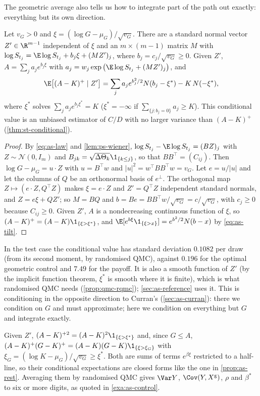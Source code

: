 The geometric average also tells us how to integrate part of the path out exactly: everything
but its own direction.

\begin{proposition}\label{prop:as-rest}
Let $v_G>0$ and $\xi=(\log G-\mu_G)/\sqrt{v_G}$. There are a standard normal vector
$Z'\in\R^{m-1}$ independent of $\xi$ and an $m\times(m-1)$ matrix $M$ with
$\log S_{t_j}=\E\log S_{t_j}+b_j\xi+(MZ')_j$, where $b_j=c_j/\sqrt{v_G}\ge0$. Given $Z'$,
$A=\sum_ja_je^{b_j\xi}$ with $a_j=w_j\exp\big(\E\log S_{t_j}+(MZ')_j\big)$, and
\[
  \E\big[(A-K)^+\mid Z'\big]=\sum_ja_je^{b_j^2/2}N(b_j-\xi^*)-K\,N(-\xi^*),
\]
where $\xi^*$ solves $\sum_ja_je^{b_j\xi^*}=K$ ($\xi^*=-\infty$ if
$\sum_{\{j:b_j=0\}}a_j\ge K$). This conditional value is an unbiased estimator of $C/D$ with
no larger variance than $(A-K)^+$ (\cref{thm:st-conditional}).
\end{proposition}

\begin{proof}
By \eqref{eq:as-law} and \cref{lem:ps-wiener}, $\log S_{t_j}-\E\log S_{t_j}=(BZ)_j$ with
$Z\sim\mathcal N(0,I_m)$ and $B_{jk}=\sqrt{\Delta\Theta_k}\1_{\{k\le j\}}$, so that $BB^\top=(C_{ij})$.
Then $\log G-\mu_G=u\cdot Z$ with $u=B^\top w$ and $|u|^2=w^\top BB^\top w=v_G$. Let $e=u/|u|$
and let the columns of $Q$ be an orthonormal basis of $e^\perp$. The orthogonal map
$Z\mapsto(e\cdot Z,Q^\top Z)$ makes $\xi=e\cdot Z$ and $Z'=Q^\top Z$ independent standard
normals, and $Z=e\xi+QZ'$; so $M=BQ$ and $b=Be=BB^\top w/\sqrt{v_G}=c/\sqrt{v_G}$, with
$c_j\ge0$ because $C_{ij}\ge0$. Given $Z'$, $A$ is a nondecreasing continuous function of
$\xi$, so $(A-K)^+=(A-K)\1_{\{\xi>\xi^*\}}$, and $\E[e^{b\xi}\1_{\{\xi>x\}}]=e^{b^2/2}N(b-x)$ by
\eqref{eq:as-tilt}.
\end{proof}

In the test case the conditional value has standard deviation $0.1082$ per draw (from its
second moment, by randomised QMC), against
$0.196$ for the optimal geometric control and $7.49$ for the payoff. It is also a smooth
function of $Z'$ (by the implicit function theorem, $\xi^*$ is smooth where it is finite),
which is what randomised QMC needs (\cref{prop:qmc-rqmc}); \cref{sec:as-reference} uses it.
This is conditioning in the opposite direction to Curran's (\cref{sec:as-curran}): there we
condition on $G$ and must approximate; here we condition on everything but $G$ and integrate
exactly.

\begin{remark}\label{rem:as-exact-moments}
Given $Z'$, $(A-K)^{+2}=(A-K)^2\1_{\{\xi>\xi^*\}}$ and, since $G\le A$,
$(A-K)^+(G-K)^+=(A-K)(G-K)\1_{\{\xi>\xi_G\}}$ with $\xi_G=(\log K-\mu_G)/\sqrt{v_G}\ge\xi^*$.
Both are sums of terms $e^{\beta\xi}$ restricted to a half-line, so their conditional
expectations are closed forms like the one in \cref{prop:as-rest}. Averaging them by randomised
QMC gives $\Var Y$, $\Cov(Y,X^{\mathrm g})$, $\rho$ and $\beta^*$ to six or more digits, as
quoted in \cref{exa:as-control}.
\end{remark}

